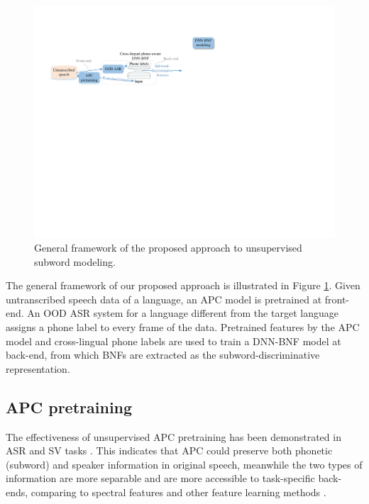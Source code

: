 \documentclass[a4paper]{article}
\begin{document}
\begin{figure}
    \centering
    \includegraphics[width=\linewidth]{LaTeX/apc_framework_detail.pdf}
    \caption{General framework of the proposed approach to unsupervised subword modeling.  }
    \label{fig:general_framework}
\end{figure}
The general framework of our proposed approach is illustrated in Figure \ref{fig:general_framework}. Given untranscribed speech data of a    language, an APC  model is pretrained at front-end.
An OOD ASR system for a language different from the target language  assigns a phone label to every frame of the data. Pretrained features by the APC model and  cross-lingual phone labels are used to train a DNN-BNF model at back-end, from which BNFs are extracted as the subword-discriminative representation.
\subsection{APC pretraining}
\label{subsec:apc}
The effectiveness of unsupervised APC pretraining  has been demonstrated in   ASR and SV tasks \cite{Chung2019}. This  indicates that APC could preserve both phonetic (subword) and speaker information in original speech, meanwhile the two types of information are more  separable and are more accessible to task-specific back-ends, comparing to spectral features and other feature learning methods \cite{Chung2019}. 
\end{document}
